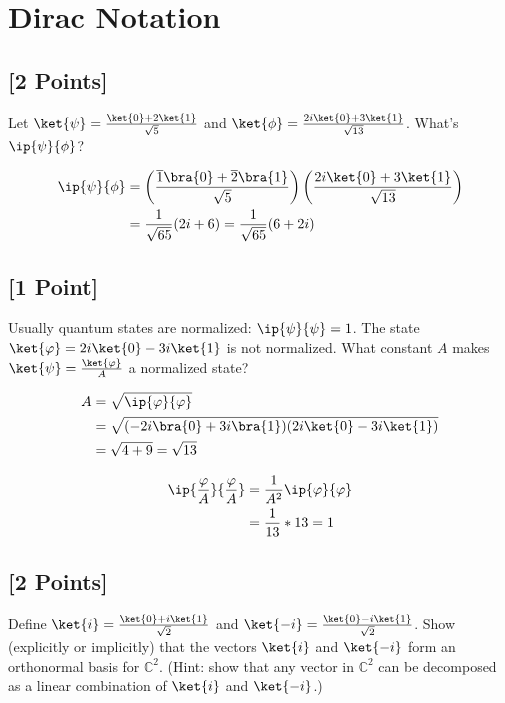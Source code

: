 \documentclass[11pt]{article}
\begin{document}
\section{Dirac Notation}
 
\subsection{[2 Points]} Let $\ket{\psi} = \frac{\ket{0} + 2 \ket{1}}{\sqrt{5}}$ and $\ket{\phi} = \frac{2i\ket{0} + 3\ket{1}}{\sqrt{13}}$. What's $\ip{\psi}{\phi}$?

\begin{solution}
	\begin{align*}
		\ip{\psi}{\phi} &= \left( \frac{\overline{1}\bra{0} + \overline{2}\bra {1}}{\sqrt{5}} \right) \left(\frac{2i\ket{0} + 3\ket{1}}{\sqrt{13}} \right) \\
		&= \frac{1}{\sqrt{65}}(2i + 6) = \frac{1}{\sqrt{65}}(6 + 2i)
	\end{align*}
\end{solution}


\subsection{[1 Point]} Usually quantum states are normalized: $\ip{\psi}{\psi} = 1$. The state $\ket{\varphi} = 2i \ket{0} - 3i \ket{1}$ is not normalized. What constant $A$ makes $\ket{\psi} = \frac{\ket{\varphi}}{A}$ a normalized state?

\begin{solution}
	\begin{align*}
		A &= \sqrt{\ip{\varphi}{\varphi}} \\
		&= \sqrt{(-2i \bra{0} + 3i\bra{1}) (2i \ket{0} - 3i\ket{1})} \\
		&= \sqrt{4 + 9} = \sqrt{13}
	\end{align*} 

	\begin{align*}
		\ip{\frac{\varphi}{A}}{\frac{\varphi}{A}} &= \frac{1}{A^2} \ip{\varphi}{\varphi} \\ 
		&= \frac{1}{13} * 13 = 1
	\end{align*}
\end{solution}


\subsection{[2 Points]} Define $\ket{i} = \frac{\ket{0} + i \ket{1}}{\sqrt{2}}$ and $\ket{-i} = \frac{\ket{0} - i\ket{1}}{\sqrt{2}}$. Show (explicitly or implicitly) that the vectors $\ket{i}$ and $\ket{-i}$ form an orthonormal basis for $\mathbb{C}^2$.
(Hint: show that any vector in $\mathbb{C}^2$ can be decomposed as a linear combination of $\ket{i}$ and $\ket{-i}$.)
\end{document}
